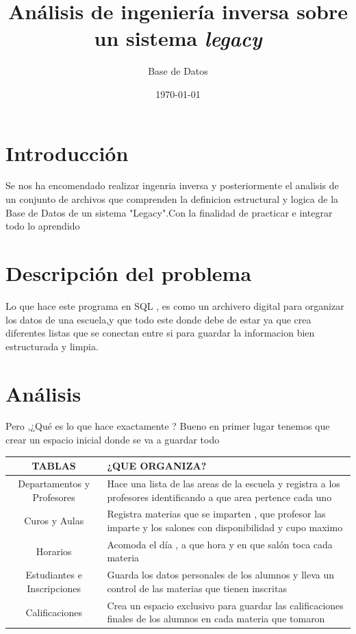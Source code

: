 \documentclass[10pt,letterpaper]{article}
\title{Análisis de ingeniería inversa sobre un sistema \textit{legacy}}
\author{Base de Datos }
\date{\today}
\begin{document}
\maketitle




\section{Introducción}
Se nos ha encomendado realizar ingenria inversa y posteriormente el analisis de un conjunto de archivos que comprenden
la definicion estructural y logica de la Base de Datos de un sistema "Legacy".Con la finalidad de practicar e integrar todo lo 
aprendido 
\section{Descripción del problema}
Lo que hace este programa en SQL , es como un archivero digital para organizar los datos 
de una escuela,y que todo este donde debe de estar ya que crea diferentes listas que se
conectan entre si para guardar la informacion bien estructurada y limpia.
\section{Análisis}
Pero ,¿Qué es lo que hace exactamente ?
Bueno en primer lugar tenemos que crear un espacio inicial donde se va a guardar todo 
\begin{table}[h!]%
    \begin{tabular}{| c |p{10cm} |} %
        \hline
        TABLAS & ¿QUE ORGANIZA? \\
        \hline
        Departamentos y Profesores & Hace una lista de las areas de la escuela
                                    y registra a los profesores identificando a que 
                                    area pertence cada uno\\ \hline
        
        Curos y Aulas              & Registra materias que se imparten , que profesor las imparte
                                     y los salones con disponibilidad y cupo maximo\\ \hline

        Horarios                   & Acomoda el día , a que hora y en que salón toca cada materia\\ \hline
        
        Estudiantes e Inscripciones & Guarda los datos personales de los alumnos y lleva un control de 
                                      las materias que tienen inscritas\\ \hline
        
        Calificaciones                & Crea un espacio exclusivo para guardar las calificaciones finales de los
                                      alumnos en cada materia que tomaron\\ \hline
    \end{tabular}
\end{table}
\end{document}
